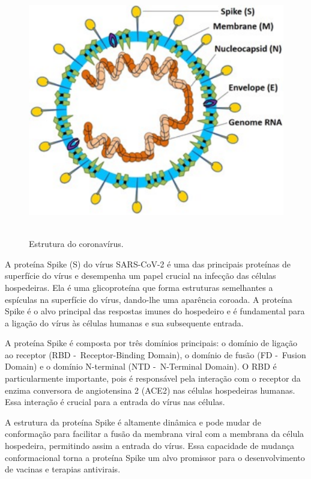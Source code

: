 \begin{figure}[htb]
  \centering
  \caption{Estrutura do coronavírus.}
  \includegraphics[scale=0.8]{figuras/estruturaSarsCov2.pdf}
  ~\label{fig:estruturaCoronavirus}
\end{figure}

A proteína Spike (S) do vírus SARS-CoV-2 é uma das principais proteínas de superfície do vírus e desempenha um papel crucial na infecção das células hospedeiras. Ela é uma glicoproteína que forma estruturas semelhantes a espículas na superfície do vírus, dando-lhe uma aparência coroada. A proteína Spike é o alvo principal das respostas imunes do hospedeiro e é fundamental para a ligação do vírus às células humanas e sua subsequente entrada.

A proteína Spike é composta por três domínios principais: o domínio de ligação ao receptor (RBD -~Receptor-Binding Domain), o domínio de fusão (FD -~Fusion Domain) e o domínio N-terminal (NTD -~N-Terminal Domain). O RBD é particularmente importante, pois é responsável pela interação com o receptor da enzima conversora de angiotensina 2 (ACE2) nas células hospedeiras humanas. Essa interação é crucial para a entrada do vírus nas células.

A estrutura da proteína Spike é altamente dinâmica e pode mudar de conformação para facilitar a fusão da membrana viral com a membrana da célula hospedeira, permitindo assim a entrada do vírus. Essa capacidade de mudança conformacional torna a proteína Spike um alvo promissor para o desenvolvimento de vacinas e terapias antivirais.

